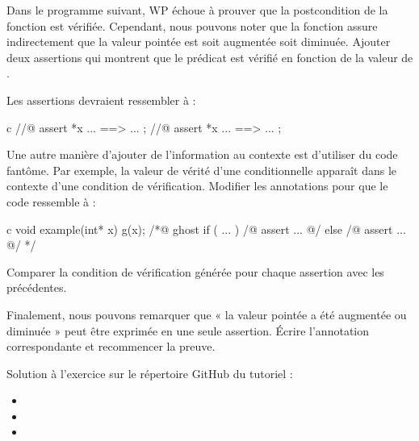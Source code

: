 





Dans le programme suivant, WP échoue à prouver que la postcondition de la
fonction  est vérifiée. Cependant, nous pouvons noter
que la fonction  assure indirectement que la valeur pointée
est soit augmentée soit diminuée. Ajouter deux assertions qui montrent que
le prédicat est vérifié en fonction de la valeur de .




Les assertions devraient ressembler à :


\begin{CodeBlock}{c}
//@ assert *x ... ==> ... ;
//@ assert *x ... ==> ... ;
\end{CodeBlock}


Une autre manière d'ajouter de l'information au contexte est d'utiliser du
code fantôme. Par exemple, la valeur de vérité d'une conditionnelle apparaît
dans le contexte d'une condition de vérification. Modifier les annotations pour
que le code ressemble à :


\begin{CodeBlock}{c}
void example(int* x){
  g(x);
  /*@ ghost
   if ( ... ){
    /@ assert ... @/
   } else {
    /@ assert ... @/
   }
  */
}
\end{CodeBlock}

Comparer la condition de vérification générée pour chaque assertion avec les
précédentes.


Finalement, nous pouvons remarquer que « la valeur pointée a été augmentée ou
diminuée » peut être exprimée en une seule assertion. Écrire l'annotation
correspondante et recommencer la preuve.


\begin{Information}
  Solution à l'exercice sur le répertoire GitHub du tutoriel :
  \begin{itemize}
    \item {}
    \item {}
    \item {}
  \end{itemize}
\end{Information}


